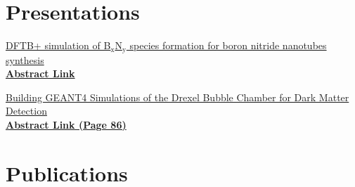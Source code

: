\documentclass[]{deedy-resume-openfont}
\begin{document}
\begin{minipage}[t]{0.44\textwidth}
\section{Presentations}


\href{http://meetings.aps.org/Meeting/GEC20/Session/TR1.3}{DFTB+ simulation of B$_{\mathrm{x}}$N$_{\mathrm{y}}$ species formation for boron nitride nanotubes synthesis}\\
\href{http://meetings.aps.org/Meeting/GEC20/Session/TR1.3}{\textbf{Abstract Link}}
\sectionsep


\href{https://issuu.com/ericalevizelinger/docs/2018_abstract_booklet_-_web_final}{Building GEANT4 Simulations of the Drexel Bubble Chamber for Dark Matter Detection}\\
\href{https://issuu.com/ericalevizelinger/docs/2018_abstract_booklet_-_web_final}{\textbf{Abstract Link (Page 86)}}
\sectionsep

\section{Publications} 
\renewcommand\refname{\vskip -1.5em} %


\nocite{*}





\end{minipage}
\end{document}
